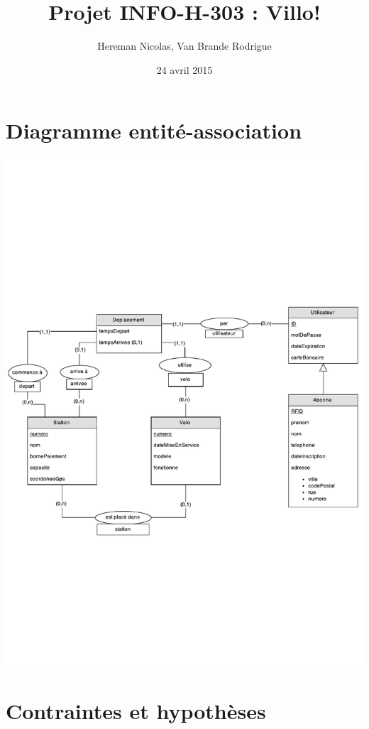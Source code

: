 \documentclass[a4paper, 12pt]{report}
\title{Projet INFO-H-303 : Villo!}
\author{Hereman Nicolas, Van Brande Rodrigue}
\date{24 avril 2015}
\begin{document}
\maketitle 

\section*{Diagramme entité-association} %
	\includegraphics{entityassocdiagram.pdf}

\section*{Contraintes et hypothèses} %
\end{document}
